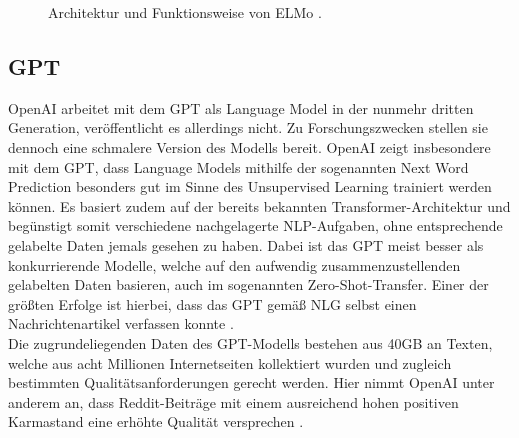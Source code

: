 \begin{figure}[h!]
  \centering
  \caption{Architektur und Funktionsweise von \ac{ELMo} \cite{IRE18}.}
  \label{pic:ElmoStructure}
\end{figure}


\subsection{GPT}
\noindent
OpenAI arbeitet mit dem \ac{GPT} als Language Model in der nunmehr dritten Generation, veröffentlicht es allerdings nicht. Zu Forschungszwecken stellen sie dennoch eine schmalere Version des Modells bereit. OpenAI zeigt insbesondere mit dem \ac{GPT}, dass Language Models mithilfe der sogenannten Next Word Prediction besonders gut im Sinne des Unsupervised Learning trainiert werden können. Es basiert zudem auf der bereits bekannten Transformer-Architektur und begünstigt somit verschiedene nachgelagerte \ac{NLP}-Aufgaben, ohne entsprechende gelabelte Daten jemals gesehen zu haben. Dabei ist das \ac{GPT} meist besser als konkurrierende Modelle, welche auf den aufwendig zusammenzustellenden gelabelten Daten basieren, auch im sogenannten Zero-Shot-Transfer. Einer der größten Erfolge ist hierbei, dass das \ac{GPT} gemäß \ac{NLG} selbst einen Nachrichtenartikel verfassen konnte \cite[S.~1]{RAD19}.\\

\noindent
Die zugrundeliegenden Daten des \ac{GPT}-Modells bestehen aus 40GB an Texten, welche aus acht Millionen Internetseiten kollektiert wurden und zugleich bestimmten Qualitätsanforderungen gerecht werden. Hier nimmt OpenAI unter anderem an, dass Reddit-Beiträge mit einem ausreichend hohen positiven Karmastand eine erhöhte Qualität versprechen \cite[S.~3]{RAD19}.\\

